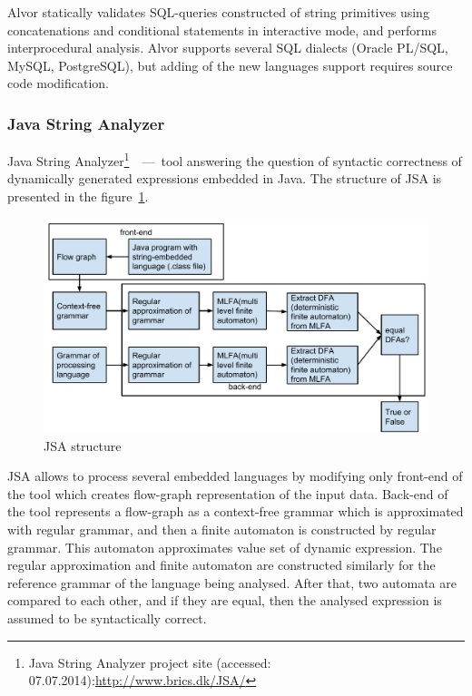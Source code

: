 \documentclass{acm_proc_article-sp}
\begin{document}
Alvor statically validates SQL-queries constructed of string primitives using concatenations and conditional statements in interactive mode, and performs interprocedural analysis. Alvor supports several SQL dialects (Oracle PL/SQL, MySQL, PostgreSQL), but adding of the new languages support requires source code modification.\newline

\subsubsection{Java String Analyzer}

Java String Analyzer\footnote{Java String Analyzer project site (accessed: 07.07.2014):\url{http://www.brics.dk/JSA/}}~\cite{StringExpr}~---~tool answering the question of syntactic correctness of dynamically generated expressions embedded in Java. The structure of JSA is presented in the figure~\ref{jsa_structure}.

\begin{figure}[h!]
    \begin{center}
        \includegraphics[scale=0.35]{graphics/JSA.pdf}
    \end{center}
    \caption{JSA structure}
    \label{jsa_structure}
\end{figure}

JSA allows to process several embedded languages by modifying only front-end of the tool which creates flow-graph representation of the input data. Back-end of the tool represents a flow-graph as a context-free grammar which is approximated with regular grammar, and then a finite automaton is constructed by regular grammar. This automaton approximates value set of dynamic expression. The regular approximation and finite automaton are constructed similarly for the reference grammar of the language being analysed. After that, two automata are compared to each other, and if they are equal, then the analysed expression is assumed to be syntactically correct.  
\end{document}
